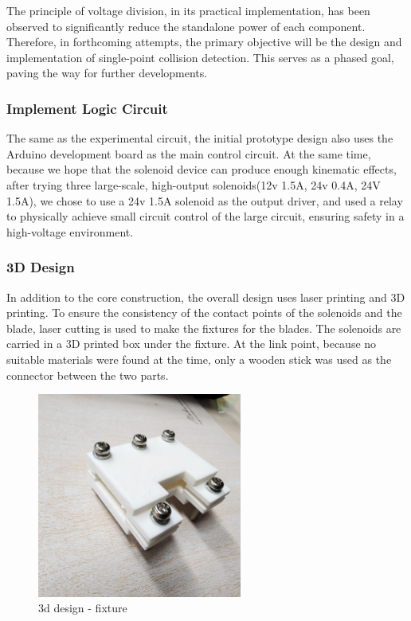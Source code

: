 The principle of voltage division, in its practical implementation, has been observed to significantly reduce the standalone power of each component. Therefore, in forthcoming attempts, the primary objective will be the design and implementation of single-point collision detection. This serves as a phased goal, paving the way for further developments.

\subsubsection{Implement Logic Circuit}
The same as the experimental circuit, the initial prototype design also uses the Arduino development board as the main control circuit. At the same time, because we hope that the solenoid device can produce enough kinematic effects, after trying three large-scale, high-output solenoids(12v 1.5A, 24v 0.4A, 24V 1.5A), we chose to use a 24v 1.5A solenoid as the output driver, and used a relay to physically achieve small circuit control of the large circuit, ensuring safety in a high-voltage environment.

\subsubsection{3D Design}
In addition to the core construction, the overall design uses laser printing and 3D printing. To ensure the consistency of the contact points of the solenoids and the blade, laser cutting is used to make the fixtures for the blades.
The solenoids are carried in a 3D printed box under the fixture. At the link point, because no suitable materials were found at the time, only a wooden stick was used as the connector between the two parts.

\begin{figure}[h]
\centering
\includegraphics[width=0.6\textwidth]{A_thesis/figures/021.jpg}
\caption{3d design - fixture}
\end{figure}


